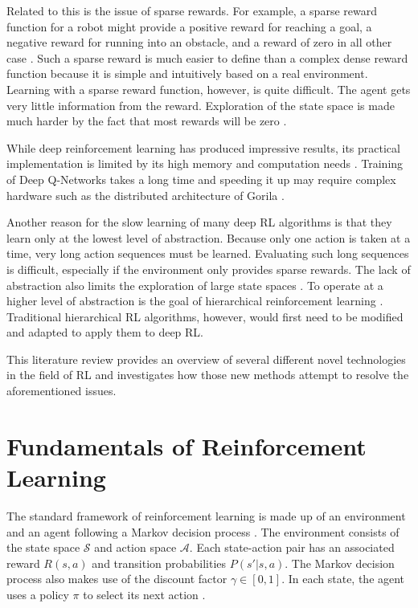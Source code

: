 \documentclass[runningheads]{llncs}
\begin{document}
Related to this is the issue of sparse rewards. For example, a sparse reward function for a robot might provide a positive reward for reaching a goal, a negative reward for running into an obstacle, and a reward of zero in all other case \cite{smart2002effective}. Such a sparse reward is much easier to define than a complex dense reward function because it is simple and intuitively based on a real environment. Learning with a sparse reward function, however, is quite difficult. The agent gets very little information from the reward. Exploration of the state space is made much harder by the fact that most rewards will be zero \cite{smart2002effective}.

While deep reinforcement learning has produced impressive results, its practical implementation is limited by its high memory and computation needs \cite{mnih2016asynchronous}. Training of Deep Q-Networks takes a long time and speeding it up may require complex hardware such as the distributed architecture of Gorila \cite{nair2015massively}.

Another reason for the slow learning of many deep RL algorithms is that they learn only at the lowest level of abstraction. Because only one action is taken at a time, very long action sequences must be learned. Evaluating such long sequences is difficult, especially if the environment only provides sparse rewards. The lack of abstraction also limits the exploration of large state spaces \cite{levy2017hierarchical}. To operate at a  higher level of abstraction is the goal of hierarchical reinforcement learning \cite{barto2003recent}. Traditional hierarchical RL algorithms, however, would first need to be modified and adapted to apply them to deep RL.

This literature review provides an overview of several different novel technologies in the field of RL and investigates how those new methods attempt to resolve the aforementioned issues.

\section{Fundamentals of Reinforcement Learning}

The standard framework of reinforcement learning is made up of an environment and an agent following a Markov decision process \cite{sutton2018reinforcement}. The environment consists of the state space $\mathcal{S}$ and action space $\mathcal{A}$. Each state-action pair has an associated reward $R(s,a)$ and transition probabilities $P(s'|s,a)$. The Markov decision process also makes use of the discount factor $\gamma \in [0,1]$. In each state, the agent uses a policy $\pi$ to select its next action \cite{sutton2018reinforcement}.
\end{document}
